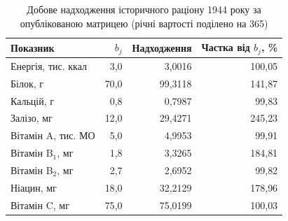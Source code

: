\begin{table}[htbp]
\centering\small
\caption{Добове надходження історичного раціону 1944 року за опублікованою матрицею (річні вартості поділено на 365)}
\label{tab:glpk-historic-1944-nutrients}
\begin{tabular}{lrrr}
\toprule
Показник & $b_j$ & Надходження & Частка від $b_j$, \% \\
\midrule
Енергія, тис. ккал & 3{,}0 & 3{,}0016 & 100{,}05 \\
Білок, г & 70{,}0 & 99{,}3118 & 141{,}87 \\
Кальцій, г & 0{,}8 & 0{,}7987 & 99{,}83 \\
Залізо, мг & 12{,}0 & 29{,}4271 & 245{,}23 \\
Вітамін A, тис. МО & 5{,}0 & 4{,}9953 & 99{,}91 \\
Вітамін B$_1$, мг & 1{,}8 & 3{,}3265 & 184{,}81 \\
Вітамін B$_2$, мг & 2{,}7 & 2{,}6952 & 99{,}82 \\
Ніацин, мг & 18{,}0 & 32{,}2129 & 178{,}96 \\
Вітамін C, мг & 75{,}0 & 75{,}0199 & 100{,}03 \\
\bottomrule
\end{tabular}
\end{table}
